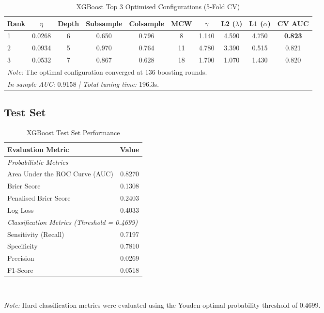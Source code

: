 \documentclass{report}\usepackage[]{graphicx}\usepackage[]{xcolor}
\begin{document}
\begin{table}[H]
    \centering
    \caption{XGBoost Top 3 Optimised Configurations (5-Fold CV)}
    \label{tab:xgb_leaderboard_v3}
    \begin{tabular}{lccccccccc}
        \hline
        \textbf{Rank} & \textbf{$\eta$} & \textbf{Depth} & \textbf{Subsample} & \textbf{Colsample} & \textbf{MCW} & \textbf{$\gamma$} & \textbf{L2 ($\lambda$)} & \textbf{L1 ($\alpha$)} & \textbf{CV AUC} \\
        \hline
        1 & 0.0268 & 6 & 0.650 & 0.796 & 8  & 1.140 & 4.590 & 4.750 & \textbf{0.823} \\
        2 & 0.0934 & 5 & 0.970 & 0.764 & 11 & 4.780 & 3.390 & 0.515 & 0.821 \\
        3 & 0.0532 & 7 & 0.867 & 0.628 & 18 & 1.700 & 1.070 & 1.430 & 0.820 \\
        \hline
        \multicolumn{10}{l}{\footnotesize \textit{Note:} The optimal configuration converged at 136 boosting rounds.} \\
        \multicolumn{10}{l}{\footnotesize \textit{In-sample AUC:} 0.9158 \textit{ | Total tuning time:} 196.3s.} \\
    \end{tabular}
\end{table}

\subsection{Test Set}

\begin{table}[H]
    \centering
    \caption{XGBoost Test Set Performance}
    \label{tab:xgb_test_eval_baseline}
    \begin{tabular}{lc}
        \hline
        \textbf{Evaluation Metric} & \textbf{Value} \\
        \hline
        \multicolumn{2}{l}{\textit{Probabilistic Metrics}} \\
        Area Under the ROC Curve (AUC) & 0.8270 \\
        Brier Score & 0.1308 \\
        Penalised Brier Score & 0.2403 \\
        Log Loss & 0.4033 \\
        \hline
        \multicolumn{2}{l}{\textit{Classification Metrics (Threshold = 0.4699)}} \\
        Sensitivity (Recall) & 0.7197 \\
        Specificity & 0.7810 \\
        Precision & 0.0269 \\
        F1-Score & 0.0518 \\
        \hline
    \end{tabular}
    \\[1ex]
    \raggedright
    \footnotesize \textit{Note:} Hard classification metrics were evaluated using the Youden-optimal probability threshold of $0.4699$.
\end{table}
\end{document}
